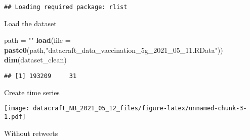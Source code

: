 \documentclass[
]{article}
\newenvironment{Shaded}{\begin{snugshade}}{\end{snugshade}}
\newcommand{\DataTypeTok}[1]{\textcolor[rgb]{0.13,0.29,0.53}{#1}}
\newcommand{\DecValTok}[1]{\textcolor[rgb]{0.00,0.00,0.81}{#1}}
\newcommand{\KeywordTok}[1]{\textcolor[rgb]{0.13,0.29,0.53}{\textbf{#1}}}
\newcommand{\NormalTok}[1]{#1}
\newcommand{\OperatorTok}[1]{\textcolor[rgb]{0.81,0.36,0.00}{\textbf{#1}}}
\newcommand{\OtherTok}[1]{\textcolor[rgb]{0.56,0.35,0.01}{#1}}
\newcommand{\StringTok}[1]{\textcolor[rgb]{0.31,0.60,0.02}{#1}}
\begin{document}
\begin{verbatim}
## Loading required package: rlist
\end{verbatim}

Load the dataset

\begin{Shaded}
\begin{Highlighting}[]
\NormalTok{path =}\StringTok{ ""}
\KeywordTok{load}\NormalTok{(}\DataTypeTok{file =} \KeywordTok{paste0}\NormalTok{(path,}\StringTok{"datacraft_data_vaccination_5g_2021_05_11.RData"}\NormalTok{))}
\KeywordTok{dim}\NormalTok{(dataset_clean)}
\end{Highlighting}
\end{Shaded}

\begin{verbatim}
## [1] 193209     31
\end{verbatim}

Create time series

\begin{Shaded}
\end{Shaded}

\texttt{[image: datacraft\_NB\_2021\_05\_12\_files/figure-latex/unnamed-chunk-3-1.pdf]}

Without retweets
\end{document}
